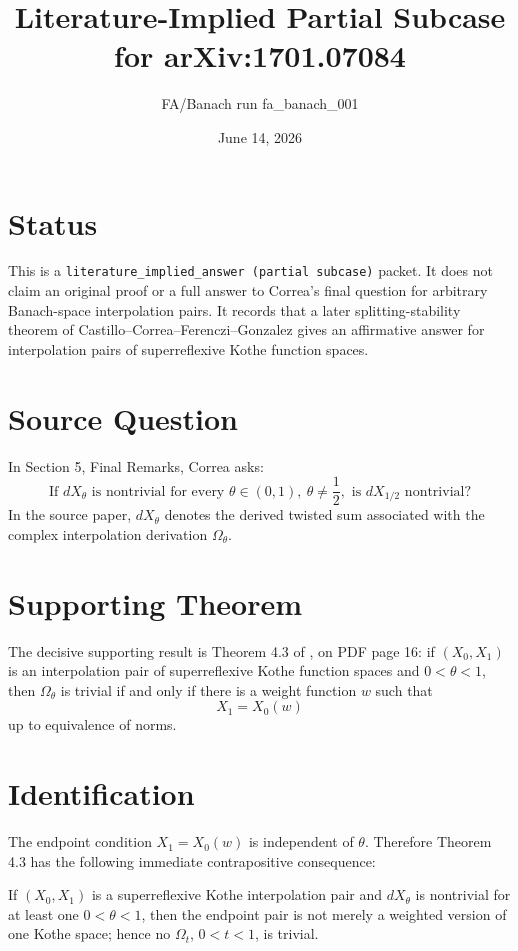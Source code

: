 \documentclass[11pt]{article}
\title{Literature-Implied Partial Subcase for arXiv:1701.07084}
\author{FA/Banach run fa\_banach\_001}
\date{June 14, 2026}
\begin{document}
\maketitle

\section*{Status}

This is a \texttt{literature\_implied\_answer (partial subcase)} packet. It
does not claim an original proof or a full answer to Correa's final question
for arbitrary Banach-space interpolation pairs. It records that a later
splitting-stability theorem of Castillo--Correa--Ferenczi--Gonzalez
\cite{CCFG2017} gives an affirmative answer for interpolation pairs of
superreflexive Kothe function spaces.

\section*{Source Question}

In Section 5, Final Remarks, Correa \cite{Correa2017} asks:
\[
  \text{If } dX_\theta \text{ is nontrivial for every }
  \theta\in(0,1),\ \theta\ne \frac12,\text{ is } dX_{1/2}
  \text{ nontrivial?}
\]
In the source paper, \(dX_\theta\) denotes the derived twisted sum associated
with the complex interpolation derivation \(\Omega_\theta\).

\section*{Supporting Theorem}

The decisive supporting result is Theorem 4.3 of
\cite{CCFG2017}, on PDF page 16:
if \((X_0,X_1)\) is an interpolation pair of superreflexive Kothe function
spaces and \(0<\theta<1\), then \(\Omega_\theta\) is trivial if and only if
there is a weight function \(w\) such that
\[
  X_1 = X_0(w)
\]
up to equivalence of norms.

\section*{Identification}

The endpoint condition \(X_1=X_0(w)\) is independent of \(\theta\). Therefore
Theorem 4.3 has the following immediate contrapositive consequence:

\medskip
\noindent
If \((X_0,X_1)\) is a superreflexive Kothe interpolation pair and
\(dX_\theta\) is nontrivial for at least one \(0<\theta<1\), then the endpoint
pair is not merely a weighted version of one Kothe space; hence no
\(\Omega_t\), \(0<t<1\), is trivial.
\end{document}
